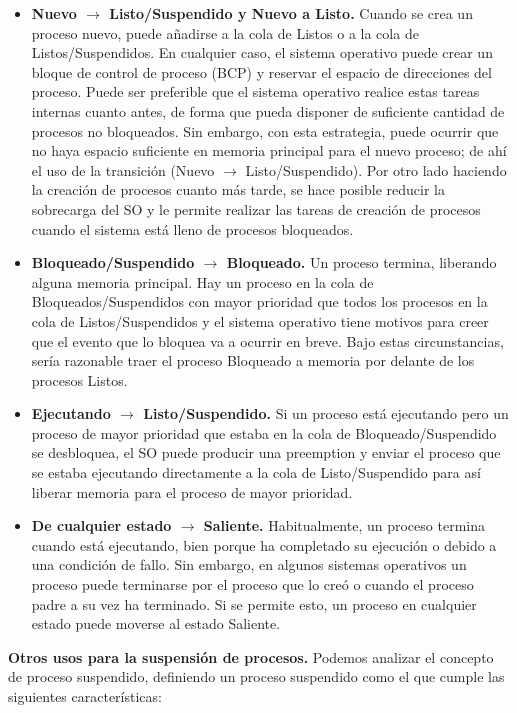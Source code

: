 \documentclass{article}
\begin{document}
\begin{itemize}
				\item \textbf{Nuevo $\rightarrow$ Listo/Suspendido y Nuevo a Listo.} Cuando se crea un proceso nuevo, puede añadirse a la cola de Listos o a la cola de Listos/Suspendidos. En cualquier caso, el sistema operativo puede crear un bloque de control de proceso (BCP) y reservar el espacio de direcciones del proceso. Puede ser preferible que el sistema operativo realice estas tareas internas cuanto antes, de forma que pueda disponer de suficiente cantidad de procesos no bloqueados. Sin embargo, con esta estrategia, puede ocurrir que no haya espacio suficiente en memoria principal para el nuevo proceso; de ahí el uso de la transición (Nuevo $\rightarrow$ Listo/Suspendido). Por otro lado haciendo la creación de procesos cuanto más tarde, se hace posible reducir la sobrecarga del SO y le permite realizar las tareas de creación de procesos cuando el sistema está lleno de procesos bloqueados.
				\item \textbf{Bloqueado/Suspendido $\rightarrow$ Bloqueado.} Un proceso termina, liberando alguna memoria principal. Hay un proceso en la
cola de Bloqueados/Suspendidos con mayor prioridad que todos los procesos en la cola de Listos/Suspendidos y el sistema operativo tiene motivos para creer que el evento que lo bloquea va a ocurrir en breve. Bajo estas circunstancias, sería razonable traer el proceso Bloqueado a memoria por delante de los procesos Listos.
				\item \textbf{Ejecutando $\rightarrow$ Listo/Suspendido.} Si un proceso está ejecutando pero un proceso de mayor prioridad que estaba en la cola de Bloqueado/Suspendido se desbloquea, el SO puede producir una preemption y enviar el proceso que se estaba ejecutando directamente a la cola de Listo/Suspendido para así liberar memoria para el proceso de mayor prioridad.
				
				\item \textbf{De cualquier estado $\rightarrow$ Saliente.} Habitualmente, un proceso termina cuando está ejecutando, bien porque ha completado su ejecución o debido a una condición de fallo. Sin embargo, en algunos sistemas operativos un proceso puede terminarse por el proceso que lo creó o cuando el proceso padre a su vez ha terminado. Si se permite esto, un proceso en cualquier estado puede moverse al estado Saliente.			
				\end{itemize}
				
				\textbf{Otros usos para la suspensión de procesos.} Podemos analizar el concepto de proceso suspendido, definiendo un proceso suspendido como el que cumple las siguientes características:
				
\end{document}
